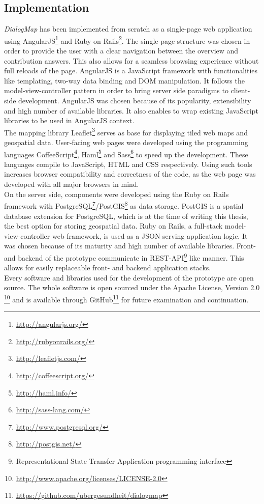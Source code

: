 \subsection{Implementation}
\label{sub:implementation}
\textit{DialogMap} has been implemented from scratch as a single-page web application using AngularJS\footnote{\url{http://angularjs.org/}} and Ruby on Rails\footnote{\url{http://rubyonrails.org/}}. The single-page structure was chosen in order to provide the user with a clear navigation between the overview and contribution answers. This also allows for a seamless browsing experience without full reloads of the page. AngularJS is a JavaScript framework with functionalities like templating, two-way data binding and DOM manipulation. It follows the model-view-controller pattern in order to bring server side paradigms to client-side development. AngularJS was chosen because of its popularity, extensibility and high number of available libraries. It also enables to wrap existing JavaScript libraries to be used in AngularJS context.\\
The mapping library Leaflet\footnote{\url{http://leafletjs.com/}} serves as base for displaying tiled web maps and geospatial data. User-facing web pages were developed using the programming languages CoffeeScript\footnote{\url{http://coffeescript.org/}}, Haml\footnote{\url{http://haml.info/}} and Sass\footnote{\url{http://sass-lang.com/}} to speed up the development. These languages compile to JavaScript, HTML and CSS respectively. Using such tools increases browser compatibility and correctness of the code, as the web page was developed with all major browsers in mind.\\
On the server side, components were developed using the Ruby on Rails framework with PostgreSQL\footnote{\url{http://www.postgresql.org/}}/PostGIS\footnote{\url{http://postgis.net/}} as data storage. PostGIS is a spatial database extension for PostgreSQL, which is at the time of writing this thesis, the best option for storing geospatial data. Ruby on Rails, a full-stack model-view-controller web framework, is used as a JSON serving application logic. It was chosen because of its maturity and high number of available libraries. Front- and backend of the prototype communicate in REST-API\footnote{Representational State Transfer Application programming interface} like manner. This allows for easily replaceable front- and backend application stacks.\\
Every software and libraries used for the development of the prototype are open source. The whole software is open sourced under the Apache License, Version 2.0 \footnote{\url{http://www.apache.org/licenses/LICENSE-2.0}} and is available through GitHub\footnote{\url{https://github.com/ubergesundheit/dialogmap}} for future examination and continuation.


